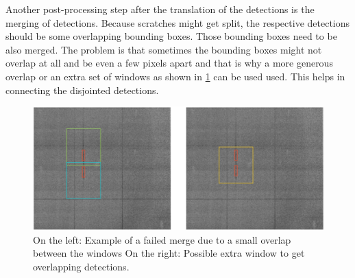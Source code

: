 Another post-processing step after the translation of the detections is the merging of detections. Because scratches might get split, the respective detections should be some overlapping bounding boxes. Those bounding boxes need to be also merged. The problem is that sometimes the bounding boxes might not overlap at all and be even a few pixels apart and that is why a more generous overlap or an extra set of windows as shown in \ref{impl:extra_win} can be used used. This helps in connecting the disjointed detections. \\

\begin{figure}[!h]
\centering
\captionsetup{justification=centering,margin=2cm}
\includegraphics[width=\columnwidth]{images/implementation/extra_windows}
\caption{On the left: Example of a failed merge due to a small overlap between the windows On the right: Possible extra window to get overlapping detections. }
\label{impl:extra_win}
\end{figure}

